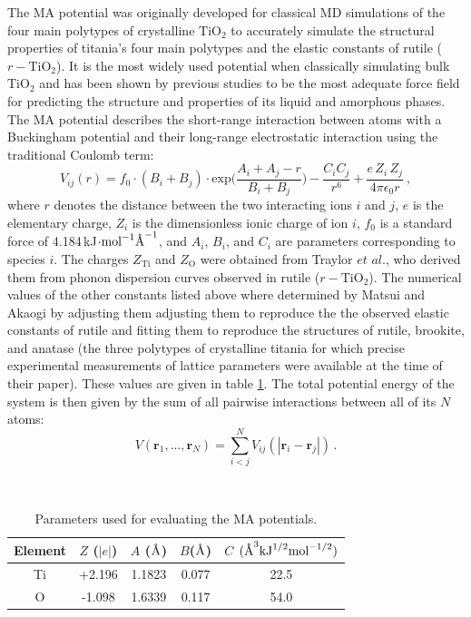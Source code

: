 \documentclass[aps,prb,twocolumn,amsmath,amssymb,superscriptaddress,longbibliography]{revtex4-1}
\newcommand{\angstrom}{\text{\normalfont\AA}}
\newcommand\tab[1][1cm]{\hspace*{#1}} %
\begin{document}
\tab The MA potential was originally developed for classical MD simulations of the four main polytypes of crystalline $\text{TiO}_2$\cite{MA_og} to accurately simulate the structural properties of titania's four main polytypes and the elastic constants of rutile ($r-\text{TiO}_2$). 
It is the most widely used potential when classically simulating bulk $\text{TiO}_2$ and has been shown by previous studies\cite{smith_collins,fichtorn,vvh1} to be the most adequate force field for predicting the structure and properties of its liquid and amorphous phases.
The MA potential describes the short-range interaction between atoms with a Buckingham potential and their long-range electrostatic interaction using the traditional Coulomb term:
\begin{equation}
V_{ij}(r) = f_{0}\cdot (B_i+B_j)\cdot\text{exp}\big(\frac{A_i + A_j - r}{B_i + B_j}\big) - \frac{C_{i}C_j}{r^6} + \frac{e\,Z_i\,Z_j}{4\pi\epsilon_0 r}\: ,
\end{equation}
where $r$ denotes the distance between the two interacting ions $i$ and $j$, $e$ is the elementary charge, $Z_i$ is the dimensionless ionic charge of ion $i$, $f_0$ is a standard force of 4.184$\,$kJ$\cdot\text{mol}^{-1}\angstrom^{-1}$, and $A_i$, $B_i$, and $C_i$ are parameters corresponding to species $i$.
The charges $Z_{\text{Ti}}$ and $Z_{\text{O}}$ were obtained from Traylor $\textit{et al.}$\cite{traylor}, who derived them from phonon dispersion curves observed in rutile ($r-\text{TiO}_2$).
The numerical values of the other constants listed above where determined by Matsui and Akaogi by adjusting them adjusting them to reproduce the the observed elastic constants of rutile and fitting them to reproduce the structures of rutile, brookite, and anatase (the three polytypes of crystalline titania for which precise experimental measurements of lattice parameters were available at the time of their paper). 
These values are given in table \ref{classpot}.
The total potential energy of the system is then given by the sum of all pairwise interactions between all of its $N$ atoms:
\begin{equation}
V(\textbf{r}_1,...,\textbf{r}_N) = \sum_{i<j}^{N} V_{ij}(|\textbf{r}_i - \textbf{r}_j|)\, .
\end{equation}

\begin{table}[]
\centering
\caption{Parameters used for evaluating the MA potentials.}
\label{classpot}
\
\begin{tabular}{ccccc}
\hline
Element & $Z$ ($|e|$) & $A$ ($\angstrom$) & $B$($\angstrom$) & $C$ $(\angstrom^3\text{kJ}^{1/2}\text{mol}^{-1/2})$ \\ \hline
Ti      & +2.196      & 1.1823            & 0.077            & 22.5                                                \\
O       & -1.098      & 1.6339            & 0.117            & 54.0                                                \\ \hline
\end{tabular}
\end{table}
\end{document}
